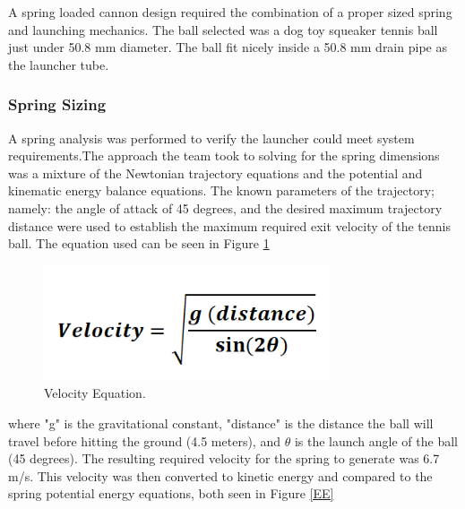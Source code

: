 \documentclass[11pt]{article}
\begin{document}
A spring loaded cannon design required the combination of a proper sized spring and launching mechanics. The ball selected was a dog toy squeaker tennis ball just under 50.8 mm diameter. The ball fit nicely inside a 50.8 mm drain pipe as the launcher tube. 


\subsubsection{Spring Sizing}
A spring analysis was performed to verify the launcher could meet system requirements.The approach the team took to solving for the spring dimensions was a mixture of the Newtonian trajectory equations and the potential and kinematic energy balance equations. The known parameters of the trajectory; namely: the angle of attack of 45 degrees, and the desired maximum trajectory distance were used to establish the maximum required exit velocity of the tennis ball. The equation used can be seen in Figure \ref{VE} \cite{5}

\begin{figure}[H]
    \centering
        \includegraphics[scale=.8, angle =0]{figures/Velocity.PNG}
    \caption{Velocity Equation.}
    \label{VE}
\end{figure}

where "g" is the gravitational constant, "distance" is the  distance the ball will travel before hitting the ground (4.5 meters), and $\theta$ is the launch angle of the ball (45 degrees). The resulting required velocity for the spring to generate was 6.7 m/s.
This velocity was then converted to kinetic energy and compared to the spring potential energy equations, both seen in Figure \ref{EE} \cite{5}
\end{document}
